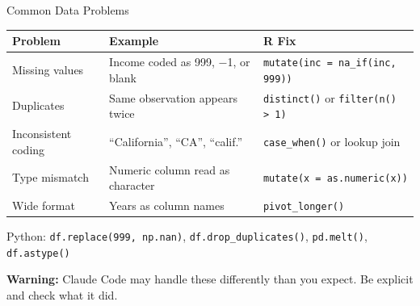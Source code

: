 \begin{frame}[fragile]{Common Data Problems}
  \small
  \begin{tabular}{@{}l>{\raggedright\arraybackslash}p{4.5cm}>{\raggedright\arraybackslash}p{4.2cm}@{}}
    \toprule
    \textbf{Problem} & \textbf{Example} & \textbf{R Fix} \\
    \midrule
    Missing values &
      Income coded as 999, $-$1, or blank &
      \texttt{mutate(inc = na\_if(inc, 999))} \\[4pt]
    Duplicates &
      Same observation appears twice &
      \texttt{distinct()} or \texttt{filter(n() > 1)} \\[4pt]
    Inconsistent coding &
      ``California'', ``CA'', ``calif.'' &
      \texttt{case\_when()} or lookup join \\[4pt]
    Type mismatch &
      Numeric column read as character &
      \texttt{mutate(x = as.numeric(x))} \\[4pt]
    Wide format &
      Years as column names &
      \texttt{pivot\_longer()} \\
    \bottomrule
  \end{tabular}

  \vspace{4pt}

  \footnotesize
  Python: \texttt{df.replace(999, np.nan)}, \texttt{df.drop\_duplicates()}, \texttt{pd.melt()}, \texttt{df.astype()}

  \vspace{2pt}

  \normalsize
  \textbf{\textcolor{usfgreen}{Warning:}} Claude Code may handle these differently than you expect. Be explicit and check what it did.
\end{frame}

